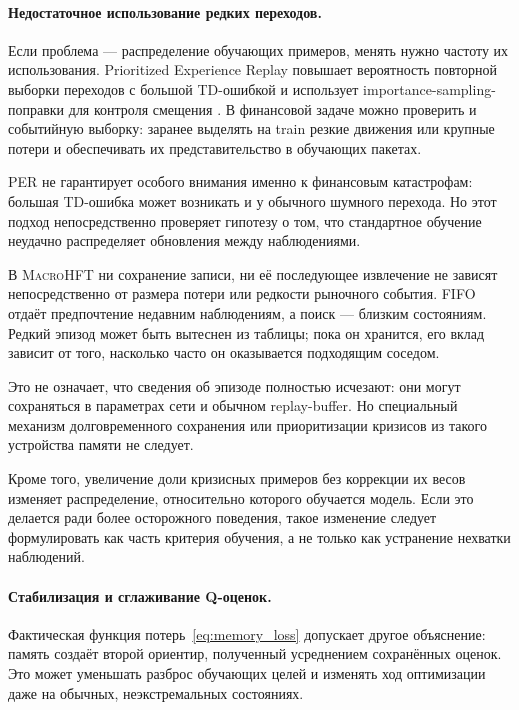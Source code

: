 \documentclass[9pt,a4paper,twocolumn]{extarticle}
\newcommand{\Macro}{\textsc{MacroHFT}}
\begin{document}
\paragraph{Недостаточное использование редких переходов.}

Если проблема --- распределение обучающих примеров, менять нужно частоту их использования.
Prioritized Experience Replay повышает вероятность повторной выборки переходов с большой
TD-ошибкой и использует importance-sampling-поправки для контроля смещения
\cite{schaul2016prioritized}. В финансовой задаче можно проверить и событийную выборку: заранее
выделять на train резкие движения или крупные потери и обеспечивать их представительство в
обучающих пакетах.

PER не гарантирует особого внимания именно к финансовым катастрофам: большая TD-ошибка может
возникать и у обычного шумного перехода. Но этот подход непосредственно проверяет гипотезу о
том, что стандартное обучение неудачно распределяет обновления между наблюдениями.

В \Macro{} ни сохранение записи, ни её последующее извлечение не зависят непосредственно от
размера потери или редкости рыночного события. FIFO отдаёт предпочтение недавним наблюдениям, а
поиск --- близким состояниям. Редкий эпизод может быть вытеснен из таблицы; пока он хранится,
его вклад зависит от того, насколько часто он оказывается подходящим соседом.

Это не означает, что сведения об эпизоде полностью исчезают: они могут сохраняться в параметрах
сети и обычном replay-buffer. Но специальный механизм долговременного сохранения или
приоритизации кризисов из такого устройства памяти не следует.

Кроме того, увеличение доли кризисных примеров без коррекции их весов изменяет распределение,
относительно которого обучается модель. Если это делается ради более осторожного поведения,
такое изменение следует формулировать как часть критерия обучения, а не только как устранение
нехватки наблюдений.

\paragraph{Стабилизация и сглаживание Q-оценок.}

Фактическая функция потерь~\eqref{eq:memory_loss} допускает другое объяснение: память создаёт
второй ориентир, полученный усреднением сохранённых оценок. Это может уменьшать разброс
обучающих целей и изменять ход оптимизации даже на обычных, неэкстремальных состояниях.
\end{document}
